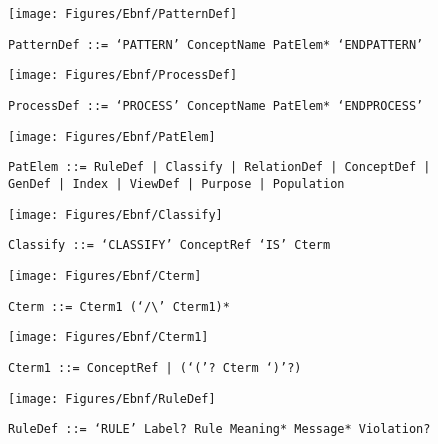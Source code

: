  \begin{figure}[H]
  \centering
  \texttt{[image: Figures/Ebnf/PatternDef]}
  \caption*{\texttt{PatternDef \small::=  `PATTERN' ConceptName PatElem* `ENDPATTERN'}}
  \label{fig:ebnf-PatternDef}
 \end{figure}

 \begin{figure}[H]
  \centering
  \texttt{[image: Figures/Ebnf/ProcessDef]}
  \caption*{\texttt{ProcessDef \small::=  `PROCESS' ConceptName PatElem* `ENDPROCESS'}}
  \label{fig:ebnf-ProcessDef}
 \end{figure}

 \begin{figure}[H]
  \centering
  \texttt{[image: Figures/Ebnf/PatElem]}
  \caption*{\texttt{PatElem \small::=  RuleDef | Classify | RelationDef | ConceptDef | GenDef | Index | ViewDef | Purpose | Population}}
  \label{fig:ebnf-PatElem}
 \end{figure}

 \begin{figure}[H]
  \centering
  \texttt{[image: Figures/Ebnf/Classify]}
  \caption*{\texttt{Classify \small::=  `CLASSIFY' ConceptRef `IS' Cterm}}
  \label{fig:ebnf-Classify}
 \end{figure}

 \begin{figure}[H]
  \centering
  \texttt{[image: Figures/Ebnf/Cterm]}
  \caption*{\texttt{Cterm \small::=  Cterm1 (`/\textbackslash{}' Cterm1)*}}
  \label{fig:ebnf-Cterm}
 \end{figure}

 \begin{figure}[H]
  \centering
  \texttt{[image: Figures/Ebnf/Cterm1]}
  \caption*{\texttt{Cterm1 \small::=  ConceptRef | (`('? Cterm `)'?)}}
  \label{fig:ebnf-Cterm1}
 \end{figure}

 \begin{figure}[H]
  \centering
  \texttt{[image: Figures/Ebnf/RuleDef]}
  \caption*{\texttt{RuleDef \small::=  `RULE' Label? Rule Meaning* Message* Violation?}}
  \label{fig:ebnf-RuleDef}
 \end{figure}

